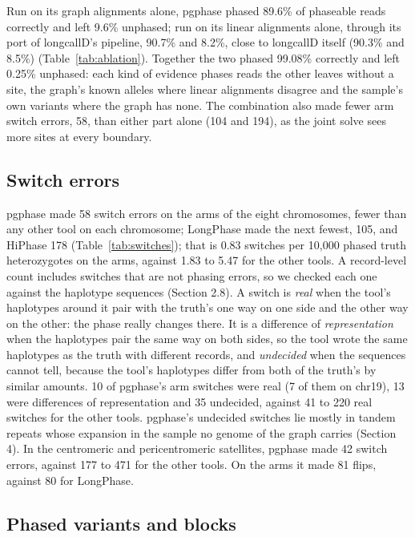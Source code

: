 Run on its graph alignments alone, pgphase phased 89.6\% of phaseable reads correctly and left 9.6\% unphased; run on its linear alignments alone, through its port of longcallD's pipeline, 90.7\% and 8.2\%, close to longcallD itself (90.3\% and 8.5\%) (Table~\ref{tab:ablation}). Together the two phased 99.08\% correctly and left 0.25\% unphased: each kind of evidence phases reads the other leaves without a site, the graph's known alleles where linear alignments disagree and the sample's own variants where the graph has none. The combination also made fewer arm switch errors, 58, than either part alone (104 and 194), as the joint solve sees more sites at every boundary.



\subsection{Switch errors}

pgphase made 58 switch errors on the arms of the eight chromosomes, fewer than any other tool on each chromosome; LongPhase made the next fewest, 105, and HiPhase 178 (Table~\ref{tab:switches}); that is 0.83 switches per 10{,}000 phased truth heterozygotes on the arms, against 1.83 to 5.47 for the other tools. A record-level count includes switches that are not phasing errors, so we checked each one against the haplotype sequences (Section 2.8). A switch is \emph{real} when the tool's haplotypes around it pair with the truth's one way on one side and the other way on the other: the phase really changes there. It is a difference of \emph{representation} when the haplotypes pair the same way on both sides, so the tool wrote the same haplotypes as the truth with different records, and \emph{undecided} when the sequences cannot tell, because the tool's haplotypes differ from both of the truth's by similar amounts. 10 of pgphase's arm switches were real (7 of them on chr19), 13 were differences of representation and 35 undecided, against 41 to 220 real switches for the other tools. pgphase's undecided switches lie mostly in tandem repeats whose expansion in the sample no genome of the graph carries (Section 4). In the centromeric and pericentromeric satellites, pgphase made 42 switch errors, against 177 to 471 for the other tools. On the arms it made 81 flips, against 80 for LongPhase.



\subsection{Phased variants and blocks}

